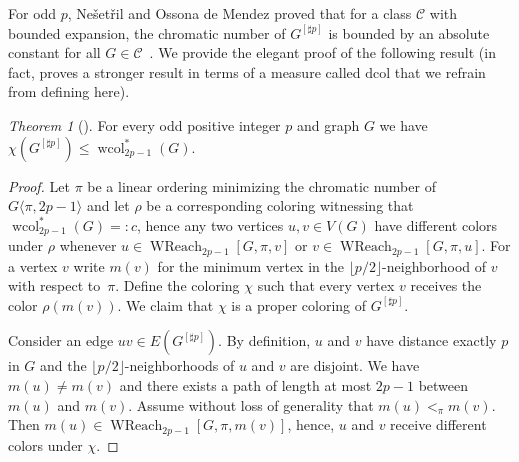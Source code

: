 \documentclass[1p,number,a4paper]{elsarticle}
\theoremstyle{remark}
\newcommand{\Cc}{\mathscr{C}}
\DeclareMathOperator{\wcol}{wcol}
\DeclareMathOperator{\WReach}{WReach}
\newtheorem{theorem}{Theorem}[section]
\begin{document}
\newcommand{\dcol}{\mathrm{dcol}}

For odd $p$, Ne\v{s}et\v{r}il and Ossona de Mendez proved that for a class $\Cc$ with bounded
expansion, the chromatic number of $G^{[\sharp p]}$ is bounded by an absolute constant for all $G\in \Cc$~\cite{nevsetril2012sparsity}. 
We provide the elegant proof of the following result (in fact, \cite{van2019chromatic} proves a stronger result in terms of a measure called $\dcol$ that we refrain from defining here). 

\begin{theorem}[\cite{van2019chromatic}]
For every odd positive integer $p$ and graph $G$ we have
$\chi(G^{[\sharp p]})\leq \wcol_{2p-1}^*(G)$. 
\end{theorem}
\begin{proof}
    Let $\pi$ be a linear ordering minimizing the chromatic number of $G\langle \pi, 2p-1\rangle$ and let $\rho$ be a corresponding coloring witnessing that $\wcol_{2p-1}^*(G)=:c$, hence any two vertices $u,v\in V(G)$ have different colors under $\rho$ whenever $u\in \WReach_{2p-1}[G,\pi,v]$ or $v\in \WReach_{2p-1}[G,\pi,u]$.
    For a vertex $v$ write $m(v)$ for the minimum vertex in the $\lfloor p/2\rfloor$-neighborhood of $v$ with respect to~$\pi$. 
    Define the coloring $\chi$ such that every vertex $v$ receives the color $\rho(m(v))$. 
    We claim that $\chi$ is a proper coloring of $G^{[\sharp p]}$. 

    Consider an edge $uv\in E(G^{[\sharp p]})$. 
    By definition, $u$ and $v$ have distance exactly $p$ in $G$ and the $\lfloor p/2\rfloor$-neighborhoods of $u$ and $v$ are disjoint. 
    We have $m(u)\neq m(v)$ and there exists a path of length at most $2p-1$ between $m(u)$ and $m(v)$. 
    Assume without loss of generality that $m(u)<_\pi m(v)$. Then $m(u)\in \WReach_{2p-1}[G,\pi, m(v)]$, hence, $u$ and $v$ receive different colors under $\chi$.  
\end{proof}


\end{document}
